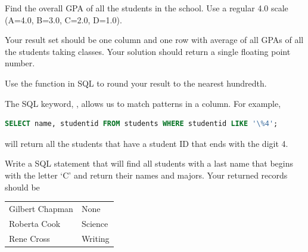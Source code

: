 \begin{problem}
Find the overall GPA of all the students in the school.
Use a regular 4.0 scale (A=4.0, B=3.0, C=2.0, D=1.0).

Your result set should be one column and one row with average of all GPAs of all the students taking classes.  
Your solution should return a single floating point number.

Use the  function in SQL to round your result to the nearest hundredth.
\label{prob:studentGPA}
\end{problem}

\begin{problem}
The SQL keyword, , allows us to match patterns in a column.
For example,
\begin{lstlisting}[language=SQL]
SELECT name, studentid FROM students WHERE studentid LIKE '\%4';
\end{lstlisting}
will return all the students that have a student ID that ends with the digit 4.

Write a SQL statement that will find all students with a last name that begins with the letter `C' and return their names and majors.  Your returned records should be
\begin{table}[H]
\begin{tabular}{|l|l|}
\hline
Gilbert Chapman & None \\
Roberta Cook & Science \\
Rene Cross & Writing \\
\hline
\end{tabular}
\label{table:likec_solution}
\end{table}
\label{prob:likec}
\end{problem}

\let\undefined\lsql 
